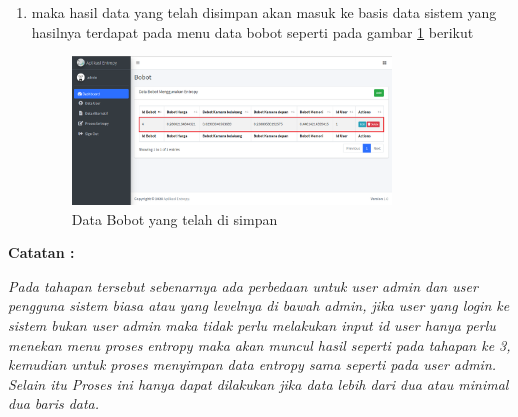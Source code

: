 \begin{enumerate}
\item maka hasil data yang telah disimpan akan masuk ke basis data sistem yang hasilnya terdapat pada menu data bobot seperti pada gambar \ref{ro6} berikut

\begin{figure}[h]
	\centerline{\includegraphics[width=0.80\textwidth]{figures/pje/6.png}}
	\caption{Data Bobot yang telah di simpan}
	\label{ro6}
\end{figure}
\end{enumerate}

\textbf{Catatan :}\par
\textit{Pada tahapan tersebut sebenarnya ada perbedaan untuk user admin dan user pengguna sistem biasa atau yang levelnya di bawah admin, jika user yang login ke sistem bukan user admin maka tidak perlu melakukan input id user hanya perlu menekan menu proses entropy maka akan muncul hasil seperti pada tahapan ke 3, kemudian untuk proses menyimpan data entropy sama seperti pada user admin. Selain itu Proses ini hanya dapat dilakukan jika data lebih dari dua atau minimal dua baris data.}

